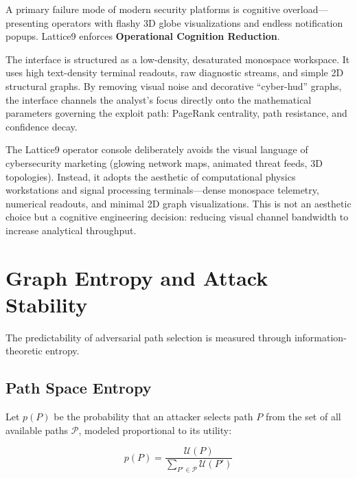 \documentclass[11pt,a4paper]{article}
\theoremstyle{definition}
\numberwithin{equation}{section}
\newcommand{\set}[1]{\mathcal{#1}}
\begin{document}
A primary failure mode of modern security platforms is cognitive overload---presenting operators with flashy 3D globe visualizations and endless notification popups. Lattice9 enforces \textbf{Operational Cognition Reduction}.

The interface is structured as a low-density, desaturated monospace workspace. It uses high text-density terminal readouts, raw diagnostic streams, and simple 2D structural graphs. By removing visual noise and decorative ``cyber-hud'' graphs, the interface channels the analyst's focus directly onto the mathematical parameters governing the exploit path: PageRank centrality, path resistance, and confidence decay.

\begin{operationalnote}
The Lattice9 operator console deliberately avoids the visual language of cybersecurity marketing (glowing network maps, animated threat feeds, 3D topologies). Instead, it adopts the aesthetic of computational physics workstations and signal processing terminals---dense monospace telemetry, numerical readouts, and minimal 2D graph visualizations. This is not an aesthetic choice but a cognitive engineering decision: reducing visual channel bandwidth to increase analytical throughput.
\end{operationalnote}

\section{Graph Entropy and Attack Stability}\label{sec:entropy}

The predictability of adversarial path selection is measured through information-theoretic entropy.

\subsection{Path Space Entropy}\label{subsec:path-entropy}

Let $p(P)$ be the probability that an attacker selects path $P$ from the set of all available paths $\set{P}$, modeled proportional to its utility:

\begin{equation}\label{eq:path-prob}
p(P) = \frac{\set{U}(P)}{\displaystyle\sum_{P' \in \set{P}} \set{U}(P')}
\end{equation}
\end{document}
